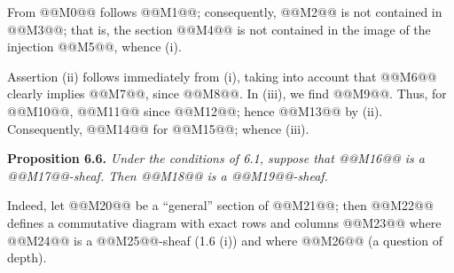 From @@M0@@ follows @@M1@@; consequently, @@M2@@ is not contained in @@M3@@; that is, the section @@M4@@ is not contained in the image of the injection @@M5@@, whence (i).

Assertion (ii) follows immediately from (i), taking into account that @@M6@@ clearly implies @@M7@@, since @@M8@@. In (iii), we find @@M9@@. Thus, for @@M10@@, @@M11@@ since @@M12@@; hence @@M13@@ by (ii). Consequently, @@M14@@ for @@M15@@; whence (iii).

\textbf{Proposition 6.6.} \emph{Under the conditions of 6.1, suppose that @@M16@@ is a @@M17@@-sheaf. Then @@M18@@ is a @@M19@@-sheaf.}

Indeed, let @@M20@@ be a ``general'' section of @@M21@@; then @@M22@@ defines a commutative diagram with exact rows and columns
@@M23@@
where @@M24@@ is a @@M25@@-sheaf (1.6 (i)) and where @@M26@@ (a question of depth).

